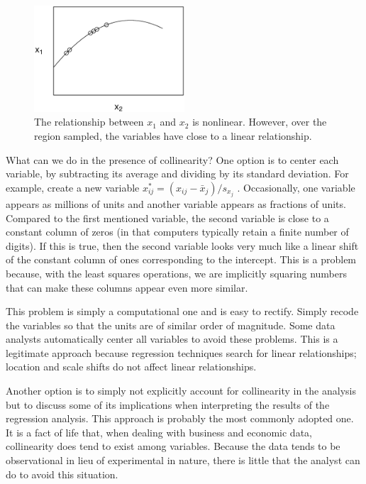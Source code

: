 \begin{figure}[htp]
  \begin{center}
    \includegraphics[width=0.5\textwidth]{Chapter5/F5Nearlinear.eps}
    \caption{\label{F5:Nearlinear} \small  The relationship
between $x_1$ and $x_2$ is nonlinear. However, over the region
sampled, the variables have close to a linear relationship.}
  \end{center}
\end{figure}



What can we do in the presence of collinearity? One option is to center each
variable, by subtracting its average and dividing by its standard deviation.
For example, create a new variable $x_{ij}^{\ast }=(x_{ij}-\bar{x}%
_j)/s_{x_j}$ . Occasionally, one variable appears as millions of
units and another variable appears as fractions of units. Compared
to the first mentioned variable, the second variable is close to a
constant column of zeros (in that computers typically retain a
finite number of digits). If this is true, then the second variable
looks very much like a linear shift of the constant column of ones
corresponding to the intercept. This is a problem because, with the
least squares operations, we are implicitly squaring numbers that
can make these columns appear even more similar.

This problem is simply a computational one and is easy to rectify.
Simply recode the variables so that the units are of similar order
of magnitude. Some data analysts automatically center all variables
to avoid these problems. This is a legitimate approach because
regression techniques search for linear relationships; location
 and scale shifts do not affect linear relationships.

Another option is to simply not explicitly account for collinearity in the
analysis but to discuss some of its implications when interpreting the
results of the regression analysis. This approach is probably the most
commonly adopted one. It is a fact of life that, when dealing with business
and economic data, collinearity does tend to exist among variables. Because
the data tends to be observational in lieu of experimental in nature, there
is little that the analyst can do to avoid this situation.

